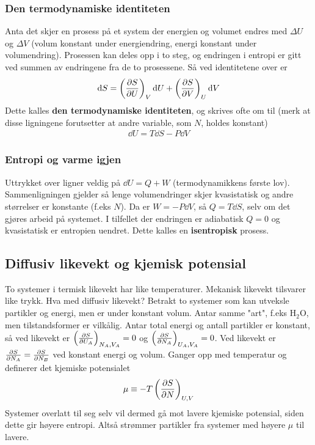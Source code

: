 \documentclass[12pt]{article}
\begin{document}
\subsubsection{Den termodynamiske identiteten}
Anta det skjer en prosess på et system der energien og volumet endres med $\Delta U$
og $\Delta V$ (volum konstant under energiendring, energi konstant under volumendring).
Prosessen kan deles opp i to steg, og endringen i entropi er gitt ved summen av
endringene fra de to prosessene. Så ved identitetene over er
\begin{align*}
  \dd S = \left( \pdv{S}{U} \right)_{V} \dd U + \left( \pdv{S}{V} \right)_{U}\dd V
\end{align*}
Dette kalles \textbf{den termodynamiske identiteten}, og skrives ofte om til (merk
at disse ligningene forutsetter at andre variable, som $N$, holdes konstant)
\begin{align*}
  \dd U = T \dd S - P \dd V
\end{align*}
\subsubsection{Entropi og varme igjen}
Uttrykket over ligner veldig på $\dd U = Q + W$ (termodynamikkens første lov).
Sammenligningen gjelder så lenge volumendringer skjer kvasistatisk og andre
størrelser er konstante (f.eks $N$). Da er $W = -P \dd V$, så $Q = T \dd S$,
selv om det gjøres arbeid på systemet. I tilfellet der endringen er adiabatisk $Q = 0$
og kvasistatisk er entropien uendret. Dette kalles en \textbf{isentropisk} prosess.
\subsection{Diffusiv likevekt og kjemisk potensial}
To systemer i termisk likevekt har like temperaturer. Mekanisk likevekt tilsvarer
like trykk. Hva med diffusiv likevekt? Betrakt to systemer som kan utveksle
partikler og energi, men er under konstant volum. Antar samme "art", f.eks $\text{H}_2\text{O}$,
men tilstandsformer er vilkålig. Antar total energi og antall partikler er konstant,
så ved likevekt er $\left( \pdv{S}{U_A} \right)_{N_A, V_A} = 0$ og $\left( \pdv{S}{N_A} \right)_{U_A, V_A} = 0$.
Ved likevekt er $\pdv{S}{N_A} = \pdv{S}{N_B}$ ved konstant energi og volum. Ganger opp
med temperatur og definerer det kjemiske potensialet
\begin{align*}
  \mu \equiv - T \left(\pdv{S}{N} \right)_{U,V}
\end{align*}
Systemer overlatt til seg selv vil dermed gå mot lavere kjemiske potensial, siden
dette gir høyere entropi. Altså strømmer partikler fra systemer med høyere $\mu$
til lavere.
\end{document}

